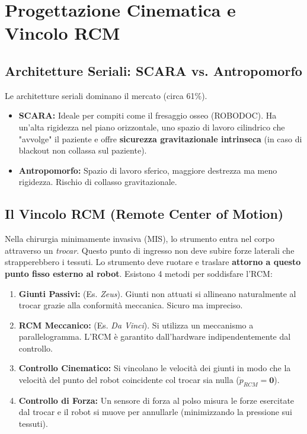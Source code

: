 \documentclass[11pt,a4paper,twoside]{report}
\begin{document}
\chapter{Progettazione Cinematica e Vincolo RCM}

\section{Architetture Seriali: SCARA vs. Antropomorfo}
Le architetture seriali dominano il mercato (circa 61\%).
\begin{itemize}
    \item \textbf{SCARA:} Ideale per compiti come il fresaggio osseo (ROBODOC). Ha un'alta rigidezza nel piano orizzontale, uno spazio di lavoro cilindrico che "avvolge" il paziente e offre \textbf{sicurezza gravitazionale intrinseca} (in caso di blackout non collassa sul paziente).
    \item \textbf{Antropomorfo:} Spazio di lavoro sferico, maggiore destrezza ma meno rigidezza. Rischio di collasso gravitazionale.
\end{itemize}

\section{Il Vincolo RCM (Remote Center of Motion)}
Nella chirurgia minimamente invasiva (MIS), lo strumento entra nel corpo attraverso un \textit{trocar}. Questo punto di ingresso non deve subire forze laterali che strapperebbero i tessuti. Lo strumento deve ruotare e traslare \textbf{attorno a questo punto fisso esterno al robot}.
Esistono 4 metodi per soddisfare l'RCM:
\begin{enumerate}
    \item \textbf{Giunti Passivi:} (Es. \textit{Zeus}). Giunti non attuati si allineano naturalmente al trocar grazie alla conformità meccanica. Sicuro ma impreciso.
    \item \textbf{RCM Meccanico:} (Es. \textit{Da Vinci}). Si utilizza un meccanismo a parallelogramma. L'RCM è garantito dall'hardware indipendentemente dal controllo.
    \item \textbf{Controllo Cinematico:} Si vincolano le velocità dei giunti in modo che la velocità del punto del robot coincidente col trocar sia nulla ($\dot{p}_{RCM} = \mathbf{0}$).
    \item \textbf{Controllo di Forza:} Un sensore di forza al polso misura le forze esercitate dal trocar e il robot si muove per annullarle (minimizzando la pressione sui tessuti).
\end{enumerate}
\end{document}
